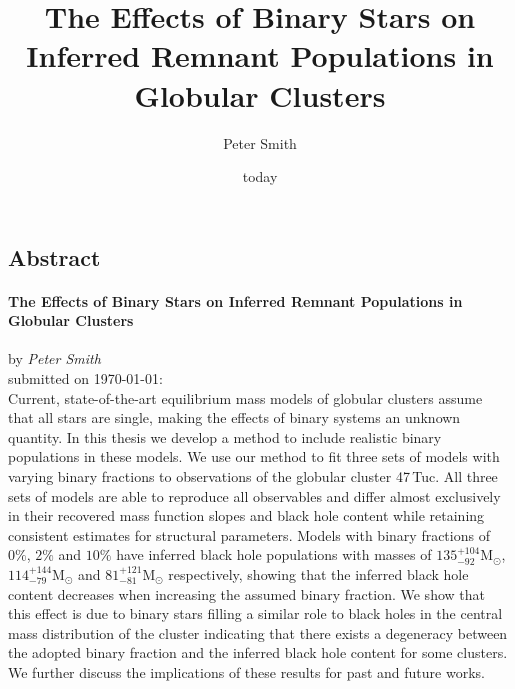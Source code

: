 \documentclass[12pt, oneside]{smuthesis}
\begin{document}
\frontmatter
\title{\sc The Effects of Binary Stars on Inferred Remnant Populations in Globular Clusters}
\author{Peter Smith}
\date{today}
\medskip

\maketitle
\pagestyle{headings}





\renewcommand{\ps}[1]{{\color{NavyBlue} Peter: #1}}


\begin{center}
    \section*{\center \sc Abstract}
    \paragraph*{\center \sc The Effects of Binary Stars on Inferred Remnant Populations in Globular Clusters\\}
    by {\em Peter Smith}\\
    submitted on \today:\\

    Current, state-of-the-art equilibrium mass models of globular clusters assume that all stars are
    single, making the effects of binary systems an unknown quantity. In this thesis we develop a
    method to include realistic binary populations in these models. We use our method to fit three
    sets of models with varying binary fractions to observations of the globular cluster 47\,Tuc.
    All three sets of models are able to reproduce all observables and differ almost exclusively in
    their recovered mass function slopes and black hole content while retaining consistent estimates
    for structural parameters. Models with binary fractions of $0\%$, $2\%$ and $10\%$ have inferred
    black hole populations with masses of $135^{+104}_{-92} \mathrm{M}_\odot$, $114^{+144}_{-79}
    \mathrm{M}_\odot$ and $81 ^{+121}_{-81} \mathrm{M}_\odot$ respectively, showing that the
    inferred black hole content decreases when increasing the assumed binary fraction. We show that
    this effect is due to binary stars filling a similar role to black holes in the central mass
    distribution of the cluster indicating that there exists a degeneracy between the adopted binary
    fraction and the inferred black hole content for some clusters. We further discuss the
    implications of these results for past and future works.


\end{center}
\newpage
\end{document}
